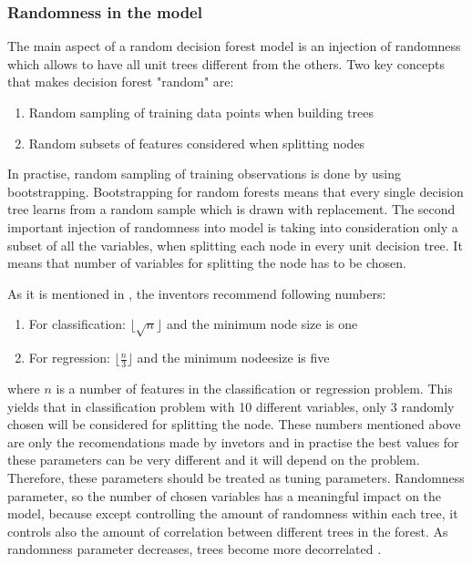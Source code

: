 \subsubsection{Randomness in the model}
The main aspect of a random decision forest model is an injection of randomness which allows to have all unit trees different from the others. Two key concepts that makes decision forest "random" are:
\begin{enumerate}
	\item Random sampling of training data points when building trees
	\item Random subsets of features considered when splitting nodes
\end{enumerate}
In practise, random sampling of training observations is done by using bootstrapping. 
Bootstrapping for random forests means that every single decision tree learns from a random sample which is drawn with replacement. 
The second important injection of randomness into model is taking into consideration only a subset of all the variables, 
when splitting each node in every unit decision tree. It means that number of variables for splitting the node has to be chosen.
 
As it is mentioned in \cite{friedman2001elements}, the inventors recommend following numbers:
\begin{enumerate}
	\item For classification:  $\lfloor{\sqrt{n}} \rfloor$ and the minimum node size is one
	\item For regression: $\lfloor \frac{n}{3} \rfloor$ and the minimum nodeesize is five
\end{enumerate}
where $n$ is a number of features in the classification or regression problem. 
This yields that in classification problem with 10 different variables, 
only 3 randomly chosen will be considered for splitting the node.
These numbers mentioned above are only the recomendations made by invetors and in practise the best values for these
parameters can be very different and it will depend on the problem. Therefore, these parameters
should be treated as tuning parameters. Randomness parameter, 
so the number of chosen variables has a meaningful impact on the model, 
because except controlling the amount of randomness within each tree, 
it controls also the amount of correlation between different trees in the forest. 
As randomness parameter decreases, trees become more decorrelated \cite{criminisi2012decision}.

